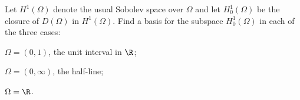 Let $H^1(\Omega)$ denote the usual Sobolev space over $\Omega$ and let
$H_0^1(\Omega)$ be the closure of $D(\Omega)$ in $H^1(\Omega)$. Find a
basis for the subspace $H_0^1(\Omega)$ in each of the three cases:
\begin{alist}
\item $\Omega=(0,1)$, the unit interval in $\R$;
\item $\Omega=(0,\infty)$, the half-line;
\item  $\Omega=\R$.
\end{alist}
